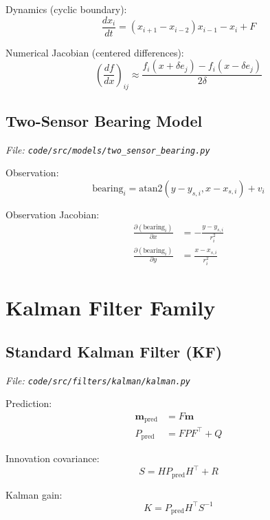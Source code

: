 \documentclass[12pt]{article}
\begin{document}
Dynamics (cyclic boundary):
\begin{equation}
\frac{dx_i}{dt} = (x_{i+1} - x_{i-2}) x_{i-1} - x_i + F
\end{equation}

Numerical Jacobian (centered differences):
\begin{equation}
\left(\frac{df}{dx}\right)_{ij} \approx \frac{f_i(x + \delta e_j) - f_i(x - \delta e_j)}{2\delta}
\end{equation}

\subsection{Two-Sensor Bearing Model}
\textit{File: \texttt{code/src/models/two\_sensor\_bearing.py}}

Observation:
\begin{equation}
\text{bearing}_i = \text{atan2}(y - y_{s,i}, x - x_{s,i}) + v_i
\end{equation}

Observation Jacobian:
\begin{align}
\frac{\partial(\text{bearing}_i)}{\partial x} &= -\frac{y - y_{s,i}}{r_i^2} \\
\frac{\partial(\text{bearing}_i)}{\partial y} &= \frac{x - x_{s,i}}{r_i^2}
\end{align}

\section{Kalman Filter Family}

\subsection{Standard Kalman Filter (KF)}
\textit{File: \texttt{code/src/filters/kalman/kalman.py}}

Prediction:
\begin{align}
\boldsymbol{m}_{\text{pred}} &= F \boldsymbol{m} \\
P_{\text{pred}} &= F P F^\top + Q
\end{align}

Innovation covariance:
\begin{equation}
S = H P_{\text{pred}} H^\top + R
\end{equation}

Kalman gain:
\begin{equation}
K = P_{\text{pred}} H^\top S^{-1}
\end{equation}
\end{document}

